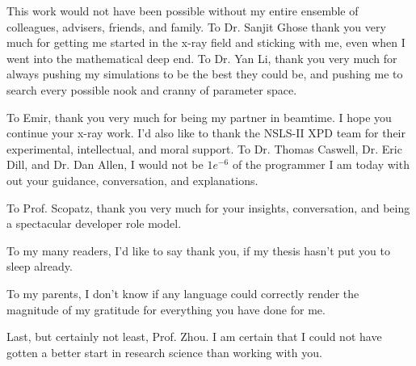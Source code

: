 This work would not have been possible without my entire ensemble of colleagues, advisers, friends, and family.
To Dr. Sanjit Ghose thank you very much for getting me started in the x-ray field and sticking with me, even when I went into the mathematical deep end.
To Dr. Yan Li, thank you very much for always pushing my simulations to be the best they could be, and pushing me to search every possible nook and cranny of parameter space.

To Emir, thank you very much for being my partner in beamtime. I hope you continue your x-ray work.
I'd also like to thank the NSLS-II XPD team for their experimental, intellectual, and moral support.
To Dr. Thomas Caswell, Dr. Eric Dill, and Dr. Dan Allen, I would not be $1e^{-6}$ of the programmer I am today with out your guidance, conversation, and explanations.

To Prof. Scopatz, thank you very much for your insights, conversation, and being a spectacular developer role model.

To my many readers, I'd like to say thank you, if my thesis hasn't put you to sleep already.

To my parents, I don't know if any language could correctly render the magnitude of my gratitude for everything you have done for me.

Last, but certainly not least, Prof. Zhou.
I am certain that I could not have gotten a better start in research science than working with you.
